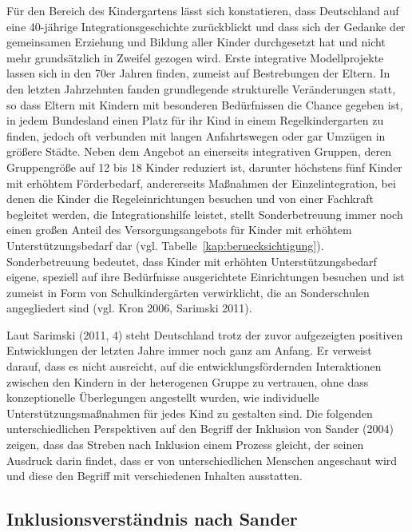 Für den Bereich des Kindergartens lässt sich konstatieren, dass Deutschland auf eine 40-jährige Integrationsgeschichte zurückblickt und dass sich der Gedanke der gemeinsamen Erziehung und Bildung aller Kinder durchgesetzt hat und nicht mehr grundsätzlich in Zweifel gezogen wird. Erste integrative Modellprojekte lassen sich in den 70er Jahren finden, zumeist auf Bestrebungen der Eltern. In den letzten Jahrzehnten fanden grundlegende strukturelle Veränderungen statt, so dass Eltern mit Kindern mit besonderen Bedürfnissen die Chance gegeben ist, in jedem Bundesland einen Platz für ihr Kind in einem Regelkindergarten zu finden, jedoch oft verbunden mit langen Anfahrtswegen oder gar Umzügen in größere Städte. Neben dem Angebot an einerseits integrativen Gruppen, deren Gruppengröße auf 12 bis 18 Kinder reduziert ist, darunter höchstens fünf Kinder mit erhöhtem Förderbedarf, andererseits Maßnahmen der Einzelintegration, bei denen die Kinder die Regeleinrichtungen besuchen und von einer Fachkraft begleitet werden, die Integrationshilfe leistet, stellt Sonderbetreuung immer noch einen großen Anteil des Versorgungsangebots für Kinder mit erhöhtem Unterstützungsbedarf dar (vgl. Tabelle~\ref{kap:beruecksichtigung}). Sonderbetreuung bedeutet, dass Kinder mit erhöhten Unterstützungsbedarf eigene, speziell auf ihre Bedürfnisse 
ausgerichtete Einrichtungen besuchen und ist zumeist in Form von Schulkindergärten verwirklicht, die an Sonderschulen angegliedert sind (vgl. Kron 2006, Sarimski 2011).

Laut Sarimski (2011, 4) steht Deutschland trotz der zuvor aufgezeigten positiven Entwicklungen der letzten Jahre immer noch ganz am Anfang. Er verweist darauf, dass es nicht ausreicht, auf die entwicklungsfördernden Interaktionen zwischen den Kindern in der heterogenen Gruppe zu vertrauen, ohne dass konzeptionelle Überlegungen angestellt wurden, wie individuelle Unterstützungsmaßnahmen für jedes Kind zu gestalten sind. Die folgenden unterschiedlichen Perspektiven auf den Begriff der Inklusion von Sander (2004) zeigen, dass das Streben nach Inklusion einem Prozess gleicht, der seinen Ausdruck darin findet, dass er von unterschiedlichen Menschen angeschaut wird und diese den Begriff mit verschiedenen Inhalten ausstatten. 


\subsection{Inklusionsverständnis nach Sander} 


